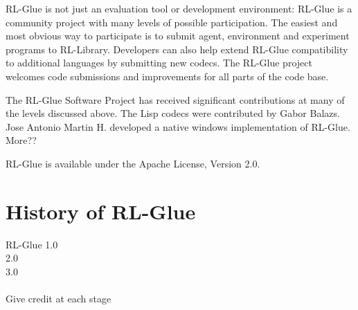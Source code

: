 \documentclass[twopage,11pt]{article}
\begin{document}
RL-Glue is not just an evaluation tool or development environment: RL-Glue is a community project with many levels of possible participation. The easiest and most obvious way to participate is to submit agent, environment and experiment programs to RL-Library. Developers can also help extend RL-Glue compatibility to additional languages by submitting new codecs. The RL-Glue project welcomes code submissions and improvements for all parts of the code base.   	

The RL-Glue Software Project has received significant contributions at many of the levels discussed above. The Lisp codecs were contributed by Gabor Balazs. Jose Antonio Martin H. developed a native windows implementation of RL-Glue. More??

RL-Glue is available under the Apache License, Version 2.0.
	

\section{History of RL-Glue}
RL-Glue 1.0\\
2.0\\
3.0
\\\\
Give credit at each stage

%
%




\end{document}
